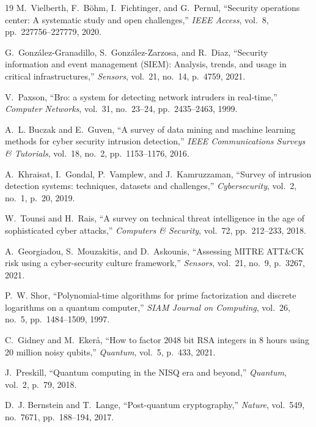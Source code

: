 \documentclass[conference]{IEEEtran}
\begin{document}
\begin{thebibliography}{19}
M.~Vielberth, F.~B\"ohm, I.~Fichtinger, and G.~Pernul, ``Security operations center: A systematic study and open challenges,'' \emph{IEEE Access}, vol.~8, pp.~227756--227779, 2020.

G.~Gonz\'alez-Granadillo, S.~Gonz\'alez-Zarzosa, and R.~Diaz, ``Security information and event management (SIEM): Analysis, trends, and usage in critical infrastructures,'' \emph{Sensors}, vol.~21, no.~14, p.~4759, 2021.

V.~Paxson, ``Bro: a system for detecting network intruders in real-time,'' \emph{Computer Networks}, vol.~31, no.~23--24, pp.~2435--2463, 1999.

A.~L. Buczak and E.~Guven, ``A survey of data mining and machine learning methods for cyber security intrusion detection,'' \emph{IEEE Communications Surveys \& Tutorials}, vol.~18, no.~2, pp.~1153--1176, 2016.

A.~Khraisat, I.~Gondal, P.~Vamplew, and J.~Kamruzzaman, ``Survey of intrusion detection systems: techniques, datasets and challenges,'' \emph{Cybersecurity}, vol.~2, no.~1, p.~20, 2019.

W.~Tounsi and H.~Rais, ``A survey on technical threat intelligence in the age of sophisticated cyber attacks,'' \emph{Computers \& Security}, vol.~72, pp.~212--233, 2018.

A.~Georgiadou, S.~Mouzakitis, and D.~Askounis, ``Assessing MITRE ATT\&CK risk using a cyber-security culture framework,'' \emph{Sensors}, vol.~21, no.~9, p.~3267, 2021.

P.~W. Shor, ``Polynomial-time algorithms for prime factorization and discrete logarithms on a quantum computer,'' \emph{SIAM Journal on Computing}, vol.~26, no.~5, pp.~1484--1509, 1997.

C.~Gidney and M.~Eker\aa, ``How to factor 2048 bit RSA integers in 8 hours using 20 million noisy qubits,'' \emph{Quantum}, vol.~5, p.~433, 2021.

J.~Preskill, ``Quantum computing in the NISQ era and beyond,'' \emph{Quantum}, vol.~2, p.~79, 2018.

D.~J. Bernstein and T.~Lange, ``Post-quantum cryptography,'' \emph{Nature}, vol.~549, no.~7671, pp.~188--194, 2017.


\end{thebibliography}
\end{document}
